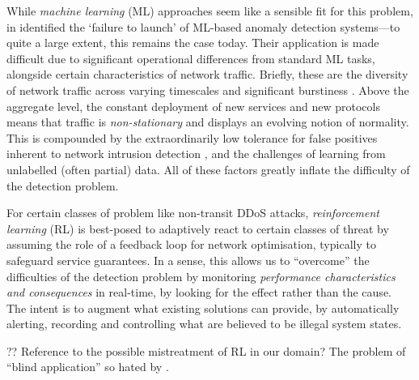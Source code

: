 \documentclass[conference, letterpaper, 10pt, times]{IEEEtran}
\begin{document}
While \emph{machine learning} (ML) approaches seem like a sensible fit for this problem, in \citeyear{DBLP:conf/sp/SommerP10} \textcite{DBLP:conf/sp/SommerP10} identified the `failure to launch' of ML-based anomaly detection systems---to quite a large extent, this remains the case today.
Their application is made difficult due to significant operational differences from standard ML tasks, alongside certain characteristics of network traffic.
Briefly, these are the diversity of network traffic across varying timescales \cite{DBLP:conf/sp/SommerP10} and significant burstiness \cite{DBLP:journals/ccr/LelandWTW95}.
Above the aggregate level, the constant deployment of new services and new protocols means that traffic is \emph{non-stationary} and displays an evolving notion of normality.
This is compounded by the extraordinarily low tolerance for false positives inherent to network intrusion detection \cite{DBLP:conf/ccs/Axelsson99}, and the challenges of learning from unlabelled (often partial) data.
All of these factors greatly inflate the difficulty of the detection problem.

For certain classes of problem like non-transit DDoS attacks, \emph{reinforcement learning} (RL) is best-posed to adaptively react to certain classes of threat by assuming the role of a feedback loop for network optimisation, typically to safeguard service guarantees.
In a sense, this allows us to ``overcome'' the difficulties of the detection problem by monitoring \emph{performance characteristics and consequences} in real-time, by looking for the effect rather than the cause.
The intent is to augment what existing solutions can provide, by automatically alerting, recording and controlling what are believed to be illegal system states.

?? Reference to the possible mistreatment of RL in our domain? The problem of ``blind application'' so hated by \textcite{DBLP:conf/sp/SommerP10}.
\end{document}
